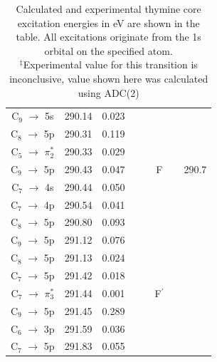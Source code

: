 \documentclass[12pt]{article}
\begin{document}
\begin{table}
\begin{tabular}{c@{\hskip 0.22in}c@{\hskip 0.22in}c@{\hskip 0.52in}c@{\hskip 0.22in}c@{\hskip 0.22in}c}
 C$_9$ $\rightarrow$ 5s & 290.14 & 0.023& \multirow{7}{*}{\ \ \ \ F} & & \multirow{7}{*}{290.7}  \\
 C$_8$ $\rightarrow$ 5p & 290.31 & 0.119 \\
 C$_5$ $\rightarrow$ $\pi^*_2$ & 290.33 & 0.029 \\
 C$_9$ $\rightarrow$ 5p & 290.43 & 0.047 \\
 C$_7$ $\rightarrow$ 4s & 290.44 & 0.050 \\
 C$_7$ $\rightarrow$ 4p & 290.54 & 0.041 \\
 C$_8$ $\rightarrow$ 5p & 290.80 & 0.093 
 \vspace{2mm}\\
 C$_9$ $\rightarrow$ 5p & 291.12 & 0.076& \multirow{7}{*}{\ \ \ \ F$^{\prime}$}\\
 C$_8$ $\rightarrow$ 5p & 291.13 & 0.024 \\
 C$_7$ $\rightarrow$ 5p & 291.42 & 0.018 \\
 C$_7$ $\rightarrow$ $\pi^*_3$ & 291.44 & 0.001 \\
 C$_9$ $\rightarrow$ 5p & 291.45 & 0.289 \\
 C$_6$ $\rightarrow$ 3p & 291.59 & 0.036 \\
 C$_7$ $\rightarrow$ 5p & 291.83 & 0.055 \\
   \end{tabular}
      \caption{Calculated and experimental thymine core excitation energies in eV are shown in the table. All excitations originate from the 1s orbital on the specified atom. \\
  $^{\ddagger}$Experimental value for this transition is inconclusive, value shown here was calculated using ADC(2)}
  \label{figure:MOs}
  \end{table}
  \\ \\
\end{document}
